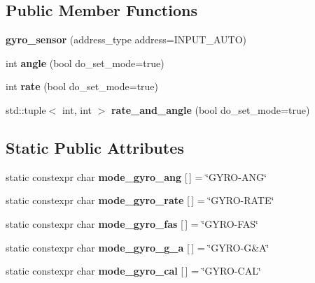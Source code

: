 \subsection*{Public Member Functions}
\begin{DoxyCompactItemize}
\item 
\mbox{\label{classev3dev_1_1gyro__sensor_a9164ac02f822150c6071fe41dd7a8a12}} 
{\bfseries gyro\+\_\+sensor} (address\+\_\+type address=I\+N\+P\+U\+T\+\_\+\+A\+U\+TO)
\item 
\mbox{\label{classev3dev_1_1gyro__sensor_acb77b5acc9f19283cd94de3dce9ff268}} 
int {\bfseries angle} (bool do\+\_\+set\+\_\+mode=true)
\item 
\mbox{\label{classev3dev_1_1gyro__sensor_a97769ed1a9f9f8b3886e4840edd6d211}} 
int {\bfseries rate} (bool do\+\_\+set\+\_\+mode=true)
\item 
\mbox{\label{classev3dev_1_1gyro__sensor_a64a12829b1181a185f91e0b4eff6cdcb}} 
std\+::tuple$<$ int, int $>$ {\bfseries rate\+\_\+and\+\_\+angle} (bool do\+\_\+set\+\_\+mode=true)
\end{DoxyCompactItemize}
\subsection*{Static Public Attributes}
\begin{DoxyCompactItemize}
\item 
\mbox{\label{classev3dev_1_1gyro__sensor_a1a9b27bc5f081d631acc1524ffc61ca3}} 
static constexpr char {\bfseries mode\+\_\+gyro\+\_\+ang} \mbox{[}$\,$\mbox{]} = \char`\"{}G\+Y\+RO-\/A\+NG\char`\"{}
\item 
\mbox{\label{classev3dev_1_1gyro__sensor_a06885304a99583e160f72aef9467e901}} 
static constexpr char {\bfseries mode\+\_\+gyro\+\_\+rate} \mbox{[}$\,$\mbox{]} = \char`\"{}G\+Y\+RO-\/R\+A\+TE\char`\"{}
\item 
\mbox{\label{classev3dev_1_1gyro__sensor_a1b19d50bcde4af65284aefffe90443f0}} 
static constexpr char {\bfseries mode\+\_\+gyro\+\_\+fas} \mbox{[}$\,$\mbox{]} = \char`\"{}G\+Y\+RO-\/F\+AS\char`\"{}
\item 
\mbox{\label{classev3dev_1_1gyro__sensor_ad54bb87ac589c8518bd70f8ebb6a93b8}} 
static constexpr char {\bfseries mode\+\_\+gyro\+\_\+g\+\_\+a} \mbox{[}$\,$\mbox{]} = \char`\"{}G\+Y\+RO-\/G\&A\char`\"{}
\item 
\mbox{\label{classev3dev_1_1gyro__sensor_ae21bd561b6c4666a9d9cdcd162057807}} 
static constexpr char {\bfseries mode\+\_\+gyro\+\_\+cal} \mbox{[}$\,$\mbox{]} = \char`\"{}G\+Y\+RO-\/C\+AL\char`\"{}
\end{DoxyCompactItemize}
